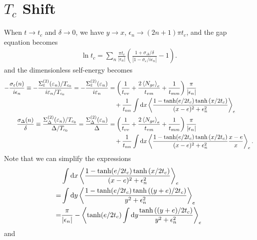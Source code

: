 \documentclass[aps,prl,preprint]{revtex4-2}
\begin{document}
\section{$T_c$ Shift}

When $t \rightarrow t_c$ and $\delta \rightarrow 0$, we have $y\rightarrow x$, $\epsilon_n\rightarrow (2n+1)\pi t_c$, and the gap equation becomes
\begin{align}
    \ln{t_c} = \sum_n\frac{\pi t_c}{|\epsilon_n|}\left(\frac{1+\sigma_\Delta/\delta}{|1-\sigma_\varepsilon/i\epsilon_n|} - 1\right).
\end{align}
and the dimensionless self-energy becomes
\begin{align}
    -\frac{\sigma_\varepsilon(n)}{i\epsilon_n} \equiv -\frac{\Sigma^{(2)}_\varepsilon(\varepsilon_n)/T_{c_0}}{i\varepsilon_n/T_{c_0}}
    = -\frac{\Sigma^{(2)}_\varepsilon(\varepsilon_n)}{i\varepsilon_n}
     & = \left(\frac{1}{t_{vv}} + \frac{2\ev{N_{ge}}_e}{t_{vm}} + \frac{1}{t_{mm}}\right)\frac{\pi}{|\epsilon_n|}   \nonumber \\
     & \quad + \frac{1}{t_{nn}}\int\dd x\ev{\frac{1-\tanh(e/2t_c)\tanh{(x/2t_c)}}{(x-e)^2 + \epsilon_n^2}}_e                  \\
    \frac{\sigma_\Delta(n)}{\delta} \equiv \frac{\Sigma^{(2)}_\Delta(\varepsilon_n)/T_{c_0}}{\Delta/T_{c_0}}
    = \frac{\Sigma^{(2)}_\Delta(\varepsilon_n)}{\Delta}
     & = \left(\frac{1}{t_{vv}} + \frac{2\ev{N_{ge}}_e}{t_{vm}} + \frac{1}{t_{mm}}\right)\frac{\pi}{|\epsilon_n|}   \nonumber \\
     & \quad + \frac{1}{t_{nn}}\int\dd x\ev{\frac{1-\tanh(e/2t_c)\tanh{(x/2t_c)}}{(x-e)^2 + \epsilon_n^2}\frac{x-e}{x}}_e.
\end{align}
Note that we can simplify the expressions
\begin{align}
      & \int\dd x\ev{\frac{1-\tanh(e/2t_c)\tanh{(x/2t_c)}}{(x-e)^2 + \epsilon_n^2}}_e \\
    = & \int\dd y\ev{\frac{1-\tanh(e/2t_c)\tanh{((y+e)/2t_c)}}{y^2 + \epsilon_n^2}}_e \\
    = & \frac{\pi}{|\epsilon_n|}-\ev{\tanh(e/2t_c)\int\dd y\frac{\tanh{((y+e)/2t_c)}}{y^2+\epsilon^2_n}}_e
\end{align}
and
\end{document}
